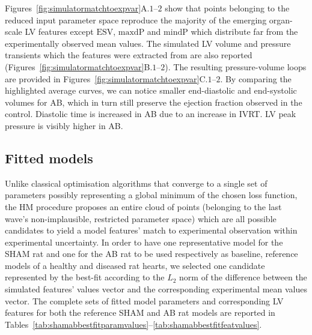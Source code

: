 \vspace{0.2cm}\noindent
Figures~\ref{fig:simulatormatchtoexpvar}A.$1$--$2$ show that points belonging to the reduced input parameter space reproduce the majority of the emerging organ-scale LV features except $\textrm{ESV}$, $\textrm{maxdP}$ and $\textrm{mindP}$ which distribute far from the experimentally observed mean values. The simulated LV volume and pressure transients which the features were extracted from are also reported (Figures~\ref{fig:simulatormatchtoexpvar}B.$1$--$2$). The resulting pressure-volume loops are provided in Figures~\ref{fig:simulatormatchtoexpvar}C.$1$--$2$.
By comparing the highlighted average curves, we can notice smaller end-diastolic and end-systolic volumes for AB, which in turn still preserve the ejection fraction observed in the control. Diastolic time is increased in AB due to an increase in IVRT. LV peak pressure is visibly higher in AB.


%
%
%
\subsection{Fitted models}\label{sec:ch4fittedmodels}
Unlike classical optimisation algorithms that converge to a single set of parameters possibly representing a global minimum of the chosen loss function, the HM procedure proposes an entire cloud of points (belonging to the last wave's non-implausible, restricted parameter space) which are all possible candidates to yield a model features' match to experimental observation within experimental uncertainty. In order to have one representative model for the SHAM rat and one for the AB rat to be used respectively as baseline, reference models of a healthy and diseased rat hearts, we selected one candidate represented by the best-fit according to the $L_2$ norm of the difference between the simulated features' values vector and the corresponding experimental mean values vector. The complete sets of fitted model parameters and corresponding LV features for both the reference SHAM and AB rat models are reported in Tables~\ref{tab:shamabbestfitparamvalues}--\ref{tab:shamabbestfitfeatvalues}.

